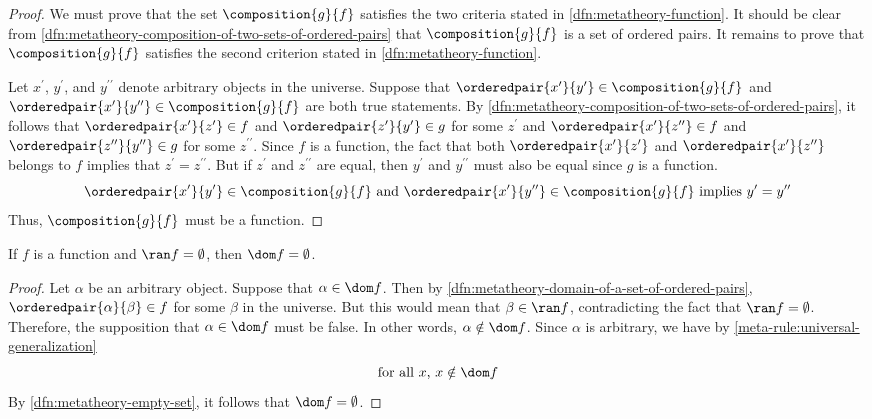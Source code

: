 \begin{proof}
    We must prove that the set \( \composition{g}{f} \) satisfies the two criteria stated in \cref{dfn:metatheory-function}.
    It should be clear from \cref{dfn:metatheory-composition-of-two-sets-of-ordered-pairs} that \( \composition{g}{f} \) is a
    set of ordered pairs. It remains to prove that \( \composition{g}{f} \) satisfies the second criterion stated in \cref{dfn:metatheory-function}.

    \vspace{0.3cm}
    \noindent
    Let \( x^{\prime} \), \( y^{\prime} \), and \( y^{\prime\prime} \) denote arbitrary objects in the universe.
    Suppose that \( \orderedpair{x^{\prime}}{y^{\prime}} \in \composition{g}{f} \) and \( \orderedpair{x^{\prime}}{y^{\prime\prime}} \in \composition{g}{f} \)
    are both true statements.
    By \cref{dfn:metatheory-composition-of-two-sets-of-ordered-pairs}, it follows that
    \( \orderedpair{x^{\prime}}{z^{\prime}} \in f \) and \( \orderedpair{z^{\prime}}{y^{\prime}} \in g \) for some \( z^{\prime} \)
    and \( \orderedpair{x^{\prime}}{z^{\prime\prime}} \in f \) and \( \orderedpair{z^{\prime\prime}}{y^{\prime\prime}} \in g \) for some \( z^{\prime\prime} \).
    Since \( f \) is a function, the fact that both \( \orderedpair{x^{\prime}}{z^{\prime}} \) and \( \orderedpair{x^{\prime}}{z^{\prime\prime}} \) belongs to
    \( f \) implies that \( z^{\prime} = z^{\prime\prime} \).
    But if \( z^{\prime} \) and \( z^{\prime\prime} \) are equal, then \( y^{\prime} \) and \( y^{\prime\prime} \) must also be equal since \( g \) is a function.
    \begin{equation*}
        \text{\( \orderedpair{x^{\prime}}{y^{\prime}} \in \composition{g}{f} \) and \( \orderedpair{x^{\prime}}{y^{\prime\prime}} \in \composition{g}{f} \) implies
        \( y^{\prime} = y^{\prime\prime} \)}
    \end{equation*}
    Thus, \( \composition{g}{f} \) must be a function.
\end{proof}

\begin{thm}
     \label{thm:metatheory-function-with-empty-range-must-have-empty-domain}
    If \( f \) is a function and \( \ran f = \emptyset \), then \( \dom f = \emptyset \).
\end{thm}

\begin{proof}
    Let \( \alpha \) be an arbitrary object.
    Suppose that \( \alpha \in \dom f \).
    Then by \cref{dfn:metatheory-domain-of-a-set-of-ordered-pairs}, \( \orderedpair{\alpha}{\beta} \in f \) for some \( \beta \) in the universe.
    But this would mean that \( \beta \in \ran f \), contradicting the fact that \( \ran f = \emptyset \).
    Therefore, the supposition that \( \alpha \in \dom f \) must be false.
    In other words, \( \alpha \notin \dom f \).
    Since \( \alpha \) is arbitrary, we have by \cref{meta-rule:universal-generalization}
    \begin{equation*}
        \text{for all \( x \), \( x \notin \dom f \)}
    \end{equation*}
    By \cref{dfn:metatheory-empty-set}, it follows that \( \dom f = \emptyset \).
\end{proof}

